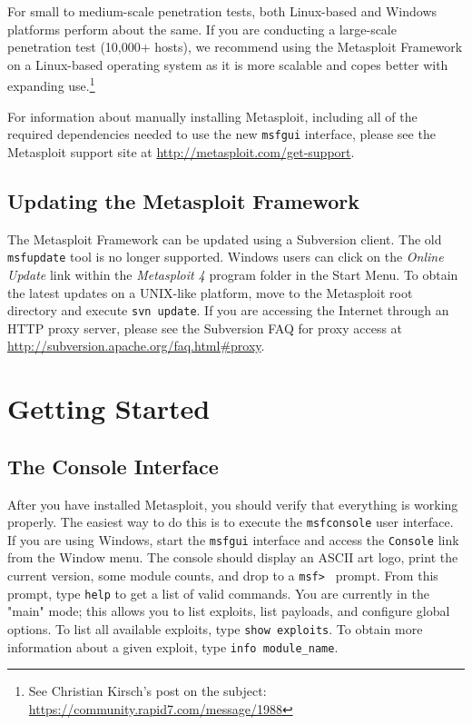 \documentclass{report}
\begin{document}
\par
For small to medium-scale penetration tests, both Linux-based and Windows
platforms perform about the same. If you are conducting a large-scale
penetration test (10,000+ hosts), we recommend using the Metasploit Framework
on a Linux-based operating system as it is more scalable and copes better with
expanding use.\footnote{See Christian Kirsch's post on the subject:
\url{https://community.rapid7.com/message/1988}}

\par
For information about manually installing Metasploit, including all of the
required dependencies needed to use the new \texttt{msfgui} interface, please
see the Metasploit support site at \url{http://metasploit.com/get-support}.

    \section{Updating the Metasploit Framework}
    \label{INSTALL-UPDATE}

\par
The Metasploit Framework can be updated using a Subversion client. The old
\texttt{msfupdate} tool is no longer supported. Windows users can click on the
\textit{Online Update} link within the \textit{Metasploit 4} program folder in
the Start Menu. To obtain the latest updates on a UNIX-like platform, move to
the Metasploit root directory and execute \texttt{svn update}. If you are
accessing the Internet through an HTTP proxy server, please see the Subversion
FAQ for proxy access at \url{http://subversion.apache.org/faq.html#proxy}.

\pagebreak

\chapter{Getting Started}

    \section{The Console Interface}
    \label{STARTED-CONSOLE}

\par
After you have installed Metasploit, you should verify that everything is
working properly. The easiest way to do this is to execute the
\texttt{msfconsole} user interface. If you are using Windows, start the
\texttt{msfgui} interface and access the \texttt{Console} link from the Window
menu. The console should display an ASCII art logo, print the current version,
some module counts, and drop to a \texttt{msf> } prompt. From this prompt, type
\texttt{help} to get a list of valid commands. You are currently in the "main"
mode; this allows you to list exploits, list payloads, and configure global
options. To list all available exploits, type \texttt{show exploits}. To obtain
more information about a given exploit, type \texttt{info module\_name}.
\end{document}
